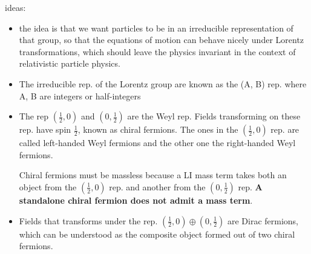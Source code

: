 ideas:
\begin{itemize}
    \item the idea is that we want particles to be in an irreducible 
	representation of that group, so that the equations of motion can 
	behave nicely under Lorentz transformations, which should leave the 
	physics invariant in the context of relativistic particle physics.
    \item The irreducible rep. of the Lorentz group are known as the (A, B) rep. 
	where A, B are integers or half-integers
    \item The rep $(\frac{1}{2}, 0)$ and $(0, \frac{1}{2})$ are the Weyl rep. 
	Fields transforming on these rep. have spin $\frac{1}{2}$, known as
	chiral fermions. The ones in the $(\frac{1}{2}, 0)$ rep. are called 
	left-handed Weyl fermions and the other one the right-handed Weyl 
	fermions.

	Chiral fermions must be massless because a LI mass term takes both an
	object from the $(\frac{1}{2}, 0)$ rep. and another from the $(0, \frac{1}{2})$
	rep. \textbf{A standalone chiral fermion does not admit a mass term}.
    \item Fields that transforms under the rep. $(\frac{1}{2}, 0) \oplus (0, \frac{1}{2})$ 
	are Dirac fermions, which can be understood as the composite object 
	formed out of two chiral fermions.
\end{itemize}

